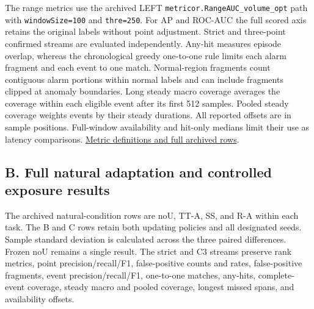 \documentclass[
  american,
]{article}
\begin{document}
The range metrics use the archived LEFT
\texttt{metricor.RangeAUC\_volume\_opt} path with
\texttt{windowSize=100} and \texttt{thre=250}. For AP and ROC-AUC the
full scored axis retains the original labels without point adjustment.
Strict and three-point confirmed streams are evaluated independently.
Any-hit measures episode overlap, whereas the chronological greedy
one-to-one rule limits each alarm fragment and each event to one match.
Normal-region fragments count contiguous alarm portions within normal
labels and can include fragments clipped at anomaly boundaries. Long
steady macro coverage averages the coverage within each eligible event
after its first 512 samples. Pooled steady coverage weights events by
their steady durations. All reported offsets are in sample positions.
Full-window availability and hit-only medians limit their use as latency
comparisons.
\href{../../docs/experiments/left_replay_exposure_repeat_20261118/comparison.csv}{Metric
definitions and full archived rows}.

\subsection{B. Full natural adaptation and controlled exposure
results}\label{b.-full-natural-adaptation-and-controlled-exposure-results}

The archived natural-condition rows are noU, TT-A, SS, and R-A within
each task. The B and C rows retain both updating policies and all
designated seeds. Sample standard deviation is calculated across the
three paired differences. Frozen noU remains a single result. The strict
and C3 streams preserve rank metrics, point precision/recall/F1,
false-positive counts and rates, false-positive fragments, event
precision/recall/F1, one-to-one matches, any-hits, complete-event
coverage, steady macro and pooled coverage, longest missed spans, and
availability offsets.
\end{document}
